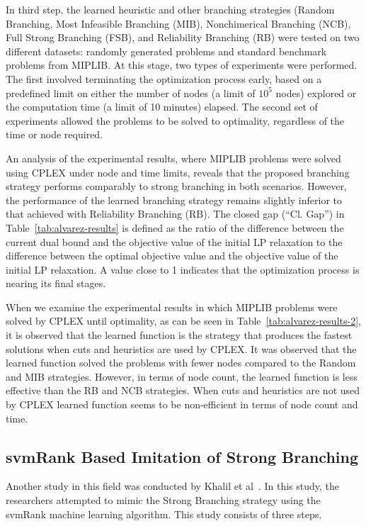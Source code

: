 In third step, the learned heuristic and other branching strategies (Random Branching, Most Infeasible Branching (MIB), Nonchimerical Branching (NCB), Full Strong Branching (FSB), and Reliability Branching (RB) were tested on two different datasets: randomly generated problems and standard benchmark problems from MIPLIB.
At this stage, two types of experiments were performed.
The first involved terminating the optimization process early, based on a predefined limit on either the number of nodes (a limit of $10^5$ nodes) explored or the computation time (a limit of 10 minutes) elapsed.
The second set of experiments allowed the problems to be solved to optimality, regardless of the time or node required.


An analysis of the experimental results, where MIPLIB problems were solved using CPLEX under node and time limits, reveals that the proposed branching strategy performs comparably to strong branching in both scenarios.
However, the performance of the learned branching strategy remains slightly inferior to that achieved with Reliability Branching (RB).
The closed gap (“Cl. Gap”) in Table~\ref{tab:alvarez-results} is defined as the ratio of the difference between the current dual bound and the objective value of the initial LP relaxation to the difference between the optimal objective value and the objective value of the initial LP relaxation.
A value close to 1 indicates that the optimization process is nearing its final stages.




When we examine the experimental results in which MIPLIB problems were solved by CPLEX until optimality, as can be seen in Table~\ref{tab:alvarez-results-2}, it is observed that the learned function is the strategy that produces the fastest solutions when cuts and heuristics are used by CPLEX.
It was observed that the learned function solved the problems with fewer nodes compared to the Random and MIB strategies.
However, in terms of node count, the learned function is less effective than the RB and NCB strategies.
When cuts and heuristics are not used by CPLEX learned function seems to be non-efficient in terms of node count and time.



\subsection{svmRank Based Imitation of Strong Branching}
Another study in this field was conducted by Khalil et al~\cite{khalilLearningBranchMixed2016}.
In this study, the researchers attempted to mimic the Strong Branching strategy using the svmRank machine learning algorithm.
This study consists of three steps.


